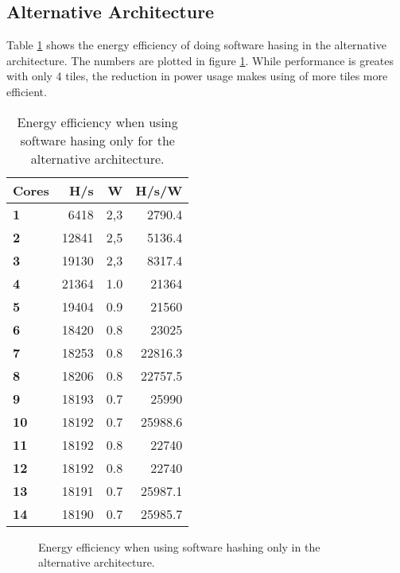 \begin{appendix}
\subsection{Alternative Architecture}

Table \ref{tab:SW-eff2} shows the energy efficiency of doing software hasing in the alternative architecture. The numbers
are plotted in figure \ref{fig:SW-eff2}. While performance is greates with only 4 tiles, the reduction in power usage
makes using of more tiles more efficient. 

\begin{table}
\centering
\begin{tabular}{| l | r | r || r |}
  \hline 
  \textbf{Cores} & \textbf{H/s} & \textbf{W} & \textbf{H/s/W} \\
  \hline                       
  \textbf{1} &  6418 & 2,3 & 2790.4\\
  \textbf{2} &  12841 & 2,5 & 5136.4\\
  \textbf{3} &  19130 & 2,3 & 8317.4\\
  \textbf{4} &  21364 & 1.0 & 21364\\
  \textbf{5} &  19404 & 0.9 & 21560\\
  \textbf{6} &  18420 & 0.8 & 23025\\
  \textbf{7} &  18253 & 0.8 & 22816.3\\
  \textbf{8} &  18206 & 0.8 & 22757.5\\
  \textbf{9} &  18193 & 0.7 & 25990\\
  \textbf{10} &  18192 & 0.7 & 25988.6\\
  \textbf{11} &  18192 & 0.8 & 22740\\
  \textbf{12} &  18192 & 0.8 & 22740\\
  \textbf{13} &  18191 & 0.7 & 25987.1\\
  \textbf{14} &  18190 & 0.7 & 25985.7\\
  \hline 
\end{tabular}
\caption{Energy efficiency when using software hasing only for the alternative architecture.}
\label{tab:SW-eff2}
\end{table}

\begin{figure}
\centering
	\caption{Energy efficiency when using software hashing only in the alternative architecture.}
	\label{fig:SW-eff2}
\end{figure}


\end{appendix}
